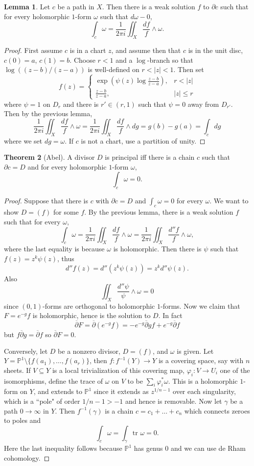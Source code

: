 \documentclass[12pt]{book}
\newcommand{\PP}{\mathbb{P}}
\newcommand{\dbar}{\overline\partial}
\theoremstyle{definition}
\newtheorem{theorem}{Theorem}[chapter]
\newtheorem{lemma}[theorem]{Lemma}
\begin{document}
\begin{lemma}
Let $c$ be a path in $X$. Then there is a weak solution $f$ to $\partial c$ such that for every holomorphic $1$-form $\omega$ such that $d\omega - 0$,
$$\int_c \omega = \frac{1}{2\pi i} \iint_X \frac{df}{f} \wedge \omega.$$
\end{lemma}
\begin{proof}
First assume $c$ is in a chart $z$, and assume then that $c$ is in the unit disc, $c(0) = a$, $c(1) = b$.
Choose $r < 1$ and a $\log$-branch so that $\log((z-b)/(z-a))$ is well-defined on $r < |z| < 1$.
Then set
$$f(z) = \begin{cases}\exp(\psi(z) \log\frac{z-b}{z-a}), &r < |z|\\
\frac{z-b}{z-a}, &|z| \leq r
\end{cases}$$
where $\psi = 1$ on $D_r$ and there is $r' \in (r, 1)$ such that $\psi = 0$ away from $D_{r'}$.
Then by the previous lemma,
$$\frac{1}{2\pi i} \iint_X \frac{df}{f} \wedge \omega = \frac{1}{2\pi i} \iint_X \frac{df}{f} \wedge dg = g(b) - g(a) = \int_c dg$$
where we set $dg = \omega$.
If $c$ is not a chart, use a partition of unity.
\end{proof}

\begin{theorem}[Abel]
A divisor $D$ is principal iff there is a chain $c$ such that $\partial c = D$ and for every holomorphic $1$-form $\omega$,
$$\int_c \omega = 0.$$
\end{theorem}
\begin{proof}
Suppose that there is $c$ with $\partial c = D$ and $\int_c \omega = 0$ for every $\omega$.
We want to show $D = (f)$ for some $f$.
By the previous lemma, there is a weak solution $f$ such that for every $\omega$,
$$\int_c \omega = \frac{1}{2\pi i} \iint_X \frac{df}{f} \wedge \omega = \frac{1}{2\pi i} \iint_X \frac{d''f}{f} \wedge \omega,$$
where the last equality is because $\omega$ is holomorphic. Then there is $\psi$ such that $f(z) = z^k\psi(z)$, thus
$$d''f(z) = d''(z^k\psi(z)) = z^k d''\psi(z).$$
Also
$$\iint_X \frac{d'' \psi}{\psi} \wedge \omega = 0$$
since $(0,1)$-forms are orthogonal to holomorphic $1$-forms.
Now we claim that $F = e^{-g}f$ is holomorphic, hence is the solution to $D$.
In fact
$$\dbar F = \dbar(e^{-g}f) = -e^{-g} \dbar g f + e^{-g} \dbar f$$
but $f\dbar g = \dbar f$ so $\dbar F = 0$.

Conversely, let $D$ be a nonzero divisor, $D = (f)$, and $\omega$ is given.
Let $Y = \PP^1 \setminus \{f(a_1), \dots, f(a_r)\}$, then $f: f^{-1}(Y) \to Y$ is a covering space, say with $n$ sheets.
If $V \subseteq Y$ is a local trivialization of this covering map, $\varphi_i: V \to U_i$ one of the isomorphisms, define the trace of $\omega$ on $V$ to be $\sum_i \varphi_i^* \omega$.
This is a holomorphic $1$-form on $Y$, and extends to $\PP^1$ since it extends as $z^{1/n - 1}$ over each singularity, which is a ``pole" of order $1/n - 1 > -1$ and hence is removable.
Now let $\gamma$ be a path $0 \to \infty$ in $Y$.
Then $f^{-1}(\gamma)$ is a chain $c = c_1 + \dots + c_n$ which connects zeroes to poles and
$$\int_c \omega = \int_\gamma \text{tr } \omega = 0.$$
Here the last inequality follows because $\PP^1$ has genus $0$ and we can use de Rham cohomology.
\end{proof}
\end{document}
